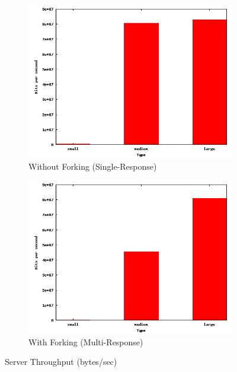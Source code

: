 \documentclass{article}
\begin{document}
\begin{figure}[H]
    \centering
    \begin{subfigure}{.5\textwidth}
        \centering
        \includegraphics[scale=0.18]{throughput.png}
        \caption{Without Forking (Single-Response)}
        \label{fig:1.1}
    \end{subfigure}%
    \begin{subfigure}{.5\textwidth}
         \centering
        \includegraphics[scale=0.18]{throughputwithfork.png}
        \caption{With Forking (Multi-Response)}
        \label{fig:1.2}
    \end{subfigure}%
    \caption{Server Throughput (bytes/sec)}
    \label{fig:1}
\end{figure}
\end{document}
